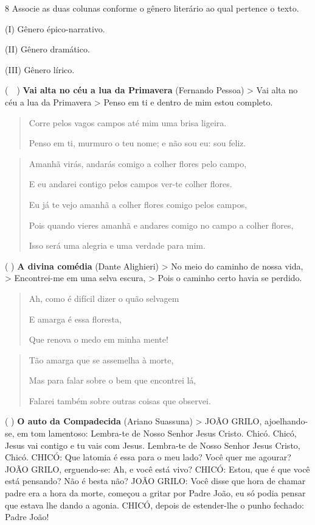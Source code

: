 \pagebreak

\num{8} Associe as duas colunas conforme o gênero literário ao qual
pertence o texto.

\begin{multicols}{2}
(I) Gênero épico-narrativo. 

(II) Gênero dramático.

(III) Gênero lírico.

\columnbreak

(~~) \textbf{Vai alta no céu a lua da Primavera} (Fernando
Pessoa) \textgreater{} Vai alta no céu a lua da Primavera \textgreater{}
Penso em ti e dentro de mim estou completo.

\begin{quote}
Corre pelos vagos campos até mim uma brisa ligeira.

Penso em ti, murmuro o teu nome; e não sou eu: sou feliz.
\end{quote}

\begin{quote}
Amanhã virás, andarás comigo a colher flores pelo campo,

E eu andarei contigo pelos campos ver-te colher flores.

Eu já te vejo amanhã a colher flores comigo pelos campos,

Pois quando vieres amanhã e andares comigo no campo a colher flores,

Isso será uma alegria e uma verdade para mim.
\end{quote}

(  ) \textbf{A divina comédia} (Dante Alighieri)
\textgreater{} No meio do caminho de nossa vida, \textgreater{}
Encontrei-me em uma selva escura, \textgreater{} Pois o caminho certo
havia se perdido.

\begin{quote}
Ah, como é difícil dizer o quão selvagem

E amarga é essa floresta,

Que renova o medo em minha mente!
\end{quote}

\begin{quote}
Tão amarga que se assemelha à morte,

Mas para falar sobre o bem que encontrei lá,

Falarei também sobre outras coisas que observei.
\end{quote}

(  ) \textbf{O auto da Compadecida} (Ariano Suassuna)
\textgreater{} JOÃO GRILO, ajoelhando-se, em tom lamentoso: Lembra-te de
Nosso Senhor Jesus Cristo. Chicó. Chicó, Jesus vai contigo e tu vais com
Jesus. Lembra-te de Nosso Senhor Jesus Cristo, Chicó. CHICÓ: Que latomia
é essa para o meu lado? Você quer me agourar? JOÃO GRILO, erguendo-se:
Ah, e você está vivo? CHICÓ: Estou, que é que você está pensando? Não é
besta não? JOÃO GRILO: Você disse que hora de chamar padre era a hora da
morte, começou a gritar por Padre João, eu só podia pensar que estava
lhe dando a agonia. CHICÓ, depois de estender-lhe o punho fechado: Padre
João!
\end{multicols}

